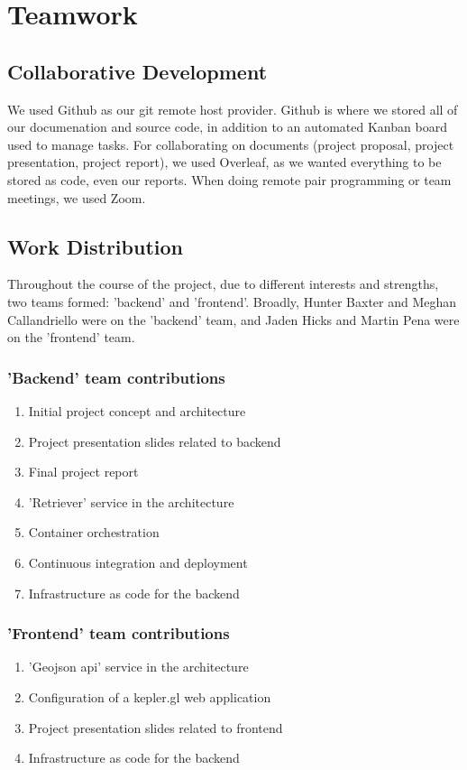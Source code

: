 \section{Teamwork}
\subsection{Collaborative Development}
We used Github as our git remote host provider.
Github is where we stored all of our documenation and source code, in addition to an automated Kanban board used to manage tasks.
For collaborating on documents (project proposal, project presentation, project report), we used Overleaf, as we wanted everything to be stored as code, even our reports.
When doing remote pair programming or team meetings, we used Zoom.

\subsection{Work Distribution}
Throughout the course of the project, due to different interests and strengths, two teams formed: 'backend' and 'frontend'.
Broadly, Hunter Baxter and Meghan Callandriello were on the 'backend' team, and Jaden Hicks and Martin Pena were on the 'frontend' team. 

\subsubsection{'Backend' team contributions}
\begin{enumerate}[i]
    \item Initial project concept and architecture
    \item Project presentation slides related to backend
    \item Final project report
    \item 'Retriever' service in the architecture
    \item Container orchestration
    \item Continuous integration and deployment
    \item Infrastructure as code for the backend
\end{enumerate}

\subsubsection{'Frontend' team contributions}
\begin{enumerate}[i]
    \item 'Geojson api' service in the architecture
    \item Configuration of a kepler.gl web application
    \item Project presentation slides related to frontend
    \item Infrastructure as code for the backend
\end{enumerate}